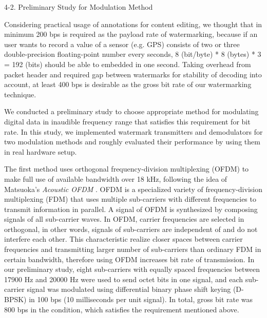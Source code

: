 4-2. Preliminary Study for Modulation Method
\fi

Considering practical usage of annotations for content editing, we thought that in minimum 200 bps is required as the payload rate of watermarking, because if an user wants to record a value of a sensor (e.g. GPS) consists of two or three double-precision floating-point number every seconds, 8 (bit/byte) * 8 (bytes) * 3 = 192 (bits) should be able to embedded in one second.
Taking overhead from packet header and required gap between watermarks for stability of decoding into account, at least 400 bps is desirable as the gross bit rate of our watermarking technique.

We conducted a preliminary study to choose appropriate method for modulating digital data in inaudible frequency range that satisfies this requirement for bit rate.
In this study, we implemented watermark transmitters and demodulators for two modulation methods and roughly evaluated their performance by using them in real hardware setup.

The first method uses orthogonal frequency-division multiplexing (OFDM) to make full use of available bandwidth over 18 kHz, following the idea of Matsuoka's {\it Acoustic OFDM} \cite{matsuoka2008acoustic}.
OFDM is a specialized variety of frequency-division 
multiplexing (FDM) that uses multiple sub-carriers with different frequencies to transmit information in parallel.
A signal of OFDM is synthesized by composing signals of all sub-carrier waves.
In OFDM, carrier frequencies are selected in orthogonal, in other words, signals of sub-carriers are independent of and do not interfere each other.
This characteristic realize closer spaces between carrier frequencies and transmitting larger number of sub-carriers than ordinary FDM in certain bandwidth, therefore using OFDM increases bit rate of transmission.
In our preliminary study, eight sub-carriers with equally spaced frequencies between 17900 Hz and 20000 Hz were used to send octet bits in one signal, and each sub-carrier signal was modulated using differential binary phase shift keying (D-BPSK) in 100 bps (10 milliseconds per unit signal).
In total, gross bit rate was 800 bps in the condition, which satisfies the requirement mentioned above.

